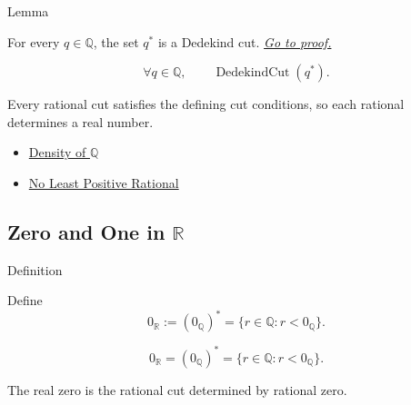 \begin{lemmabox}{Lemma}
\begin{lemma}
\label{lem:rational-cut-is-a-cut}
For every $q\in\mathbb{Q}$, the set $q^{\ast}$ is a Dedekind cut.
\hyperref[prf:rational-cut-is-a-cut]{\textit{Go to proof.}}
\end{lemma}
\end{lemmabox}

\begin{remark*}
\[
\forall q\in\mathbb{Q},\qquad \operatorname{DedekindCut}(q^{\ast}).
\]
\end{remark*}

\begin{remark*}[Interpretation]
Every rational cut satisfies the defining cut conditions, so each rational determines a real number.
\end{remark*}

\begin{dependencies}
\begin{itemize}
  \item \hyperref[thm:density-of-q]{Density of $\mathbb{Q}$}
  \item \hyperref[prop:no-least-positive-rational]{No Least Positive Rational}
\end{itemize}
\end{dependencies}

\subsection*{\texorpdfstring{Zero and One in $\mathbb{R}$}{Zero and One in R}}

\begin{definitionbox}{Definition}
\begin{definition}
\label{def:zero-in-r}
Define
\[
0_{\mathbb{R}}:=(0_{\mathbb{Q}})^{\ast}
=\{r\in\mathbb{Q}:r<0_{\mathbb{Q}}\}.
\]
\end{definition}
\end{definitionbox}

\begin{remark*}
\[
0_{\mathbb{R}}=(0_{\mathbb{Q}})^{\ast}
=\{r\in\mathbb{Q}:r<0_{\mathbb{Q}}\}.
\]
\end{remark*}

\begin{remark*}[Interpretation]
The real zero is the rational cut determined by rational zero.
\end{remark*}


